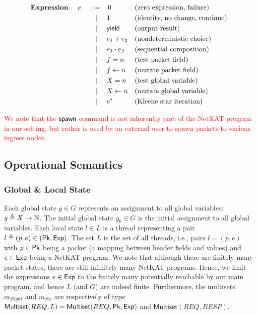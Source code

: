 \begin{align*}
	\textbf{Expression } \quad e \quad ::&\!=\! \quad 0 &&\text{(zero 
		expression, failure)} \\
	&\mid\quad 1 &&\text{(identity, no change, continue)} \\
	&\mid\quad \mathsf{yield} &&\text{(output result)} \\
	&\mid\quad e_1 + e_2 &&\text{(nondeterministic choice)} \\
	&\mid\quad e_1 \cdot e_2 &&\text{(sequential composition)} \\
	&\mid\quad f = n &&\text{(test packet field)} \\
	&\mid\quad f \leftarrow n &&\text{(mutate packet field)} \\
	&\mid\quad X = n &&\text{(test global variable)} \\
	&\mid\quad X \leftarrow n &&\text{(mutate global variable)} \\
	&\mid\quad e^* &&\text{(Kleene star iteration)} \\
\end{align*}

\textcolor{red}{We note that the $\mathsf{spawn}$ command is not inherently part of the NetKAT 
	program in our setting, but rather is used by an external user to spawn packets 
	to various ingress nodes.}




\subsection{Operational Semantics}


	
	\subsubsection{Global \& Local State}
	Each global state \( g \in G \) represents an assignment to all global 
	variables: \( g \triangleq X \to \mathbb{N} \). The initial global state \( g_0 \in G 
	\) is the initial assignment to all global variables. Each local state \( l \in 
	L \) is a thread representing a pair \( l \triangleq (p, e) \in (\mathsf{Pk}, 
	\mathsf{Exp}) \). The set \( L \) is the set of all threads, i.e., pairs \( l = (p, e) 
	\) with \( p \in \mathsf{Pk} \) being a packet (a mapping between header fields and 
	values) and \( e \in \mathsf{Exp} \) being a NetKAT program. We note that although 
	there are finitely many packet states, there are still infinitely many NetKAT 
	programs. Hence, we limit the expressions \( e \in \mathsf{Exp} \) to the finitely many 
	potentially reachable by our main program, and hence $L$ (and $G$) are indeed 
	finite. 
	Furthermore, the multisets \( m_{flight} 
	\) and \( m_{fin} \) are respectively of 
	type \( \mathsf{Multiset}(REQ, L) = \mathsf{Multiset}(REQ, \mathsf{Pk}, \mathsf{Exp}) \) and \( 
	\mathsf{Multiset}(REQ, RESP) \).
	
